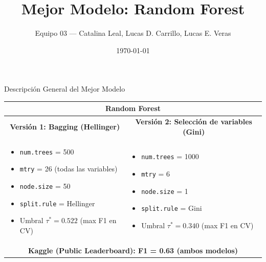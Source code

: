 \documentclass[10pt]{beamer}
\title{Mejor Modelo: Random Forest}
\author{Equipo 03 — Catalina Leal, Lucas D. Carrillo, Lucas E. Veras}
\institute{Big Data y Machine Learning — PS2}
\date{\today}
\begin{document}
\begin{frame}
\titlepage
\end{frame}
\begin{frame}{Descripción General del Mejor Modelo}
\small
\begin{tabularx}{\textwidth}{@{}X X@{}}
\multicolumn{2}{c}{\Large \textbf{Random Forest}}\\
\midrule
\multicolumn{1}{c}{\textbf{Versión 1: Bagging (Hellinger)}} & \multicolumn{1}{c}{\textbf{Versión 2: Selección de variables (Gini)}}\\
\midrule
\begin{minipage}[t]{\linewidth}
\begin{itemize}
  \item \texttt{num.trees} = 500
  \item \texttt{mtry} = 26 (todas las variables)
  \item \texttt{node.size} = 50
  \item \texttt{split.rule} = Hellinger
  \item Umbral $\tau^{*} = 0.522$ (max F1 en CV)
\end{itemize}
\end{minipage}
&
\begin{minipage}[t]{\linewidth}
\begin{itemize}
  \item \texttt{num.trees} = 1000
  \item \texttt{mtry} = 6
  \item \texttt{node.size} = 1
  \item \texttt{split.rule} = Gini
  \item Umbral $\tau^{*} = 0.340$ (max F1 en CV)
\end{itemize}
\end{minipage}
\\
\midrule
\multicolumn{2}{c}{\textbf{Kaggle (Public Leaderboard): F1 = 0.63 (ambos modelos)}}\\
\bottomrule
\end{tabularx}
\end{frame}
\end{document}
